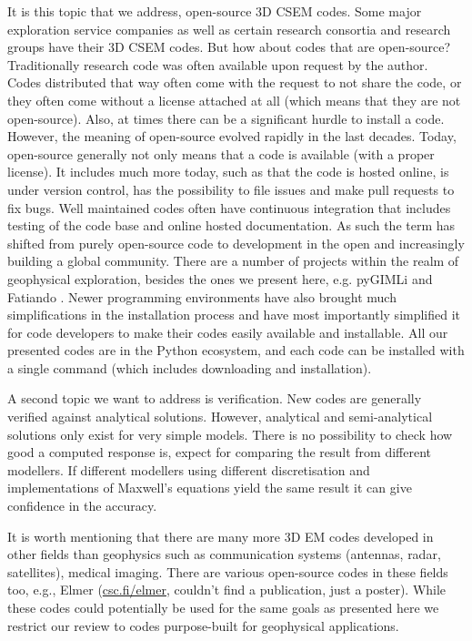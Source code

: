 \documentclass[
    paper,
  ]{geophysics}
\begin{document}
It is this topic that we address, open-source 3D CSEM codes. Some major
exploration service companies as well as certain research consortia and
research groups have their 3D CSEM codes. But how about codes that are
open-source? Traditionally research code was often available upon request by
the author. Codes distributed that way often come with the request to not share
the code, or they often come without a license attached at all (which means
that they are not open-source). Also, at times there can be a significant
hurdle to install a code. However, the meaning of open-source evolved rapidly
in the last decades. Today, open-source generally not only means that a code is
available (with a proper license). It includes much more today, such as that
the code is hosted online, is under version control, has the possibility to
file issues and make pull requests to fix bugs. Well maintained codes often
have continuous integration that includes testing of the code base and online
hosted documentation. As such the term has shifted from purely open-source code
to development in the open and increasingly building a global community. There
are a number of projects within the realm of geophysical exploration, besides
the ones we present here, e.g. pyGIMLi
\citep{CAG.17.Rucker} and Fatiando \citep{JOSS.18.Uieda}. Newer programming environments  have also brought much
simplifications in the installation process and have most importantly
simplified it for code developers to make their codes easily available and
installable. All our presented codes are in the Python ecosystem, and each code
can be installed with a single command (which includes downloading and
installation).

A second topic we want to address is verification. New codes are generally
verified against analytical solutions. However, analytical and semi-analytical
solutions only exist for very simple models. There is no possibility to check
how good a computed response is, expect for comparing the result from different
modellers. If different modellers using different discretisation and
implementations of Maxwell's equations yield the same result it can give
confidence in the accuracy.

It is worth mentioning that there are many more 3D EM codes developed in other
fields than geophysics such as communication systems (antennas, radar,
satellites), medical imaging. There are various open-source codes in these
fields  too, e.g., Elmer
(\href{http://www.csc.fi/elmer}{csc.fi/elmer}, couldn't find a publication,
just a poster). While these codes could potentially be used for the same goals
as presented here we restrict our review to codes purpose-built for geophysical
applications.
\end{document}
